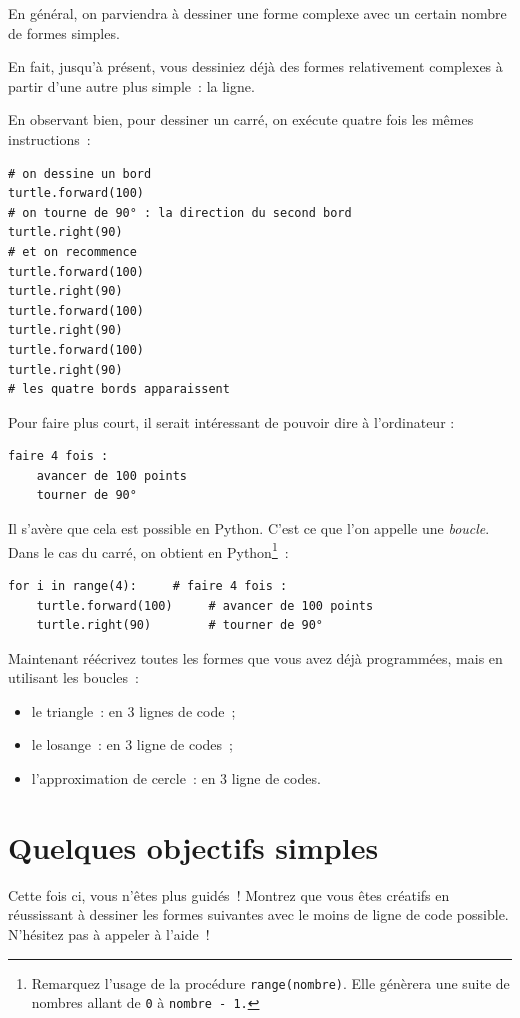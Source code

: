 \documentclass[11pt,a4paper]{article}
\begin{document}
En général, on parviendra à dessiner une forme complexe avec un certain nombre
de formes simples.

En fait, jusqu'à présent, vous dessiniez déjà des formes relativement complexes
à partir d'une autre plus simple~: la ligne.

En observant bien, pour dessiner un carré, on exécute quatre fois les mêmes
instructions~:

\begin{lstlisting}
# on dessine un bord
turtle.forward(100)
# on tourne de 90° : la direction du second bord
turtle.right(90)
# et on recommence
turtle.forward(100)
turtle.right(90)
turtle.forward(100)
turtle.right(90)
turtle.forward(100)
turtle.right(90)
# les quatre bords apparaissent
\end{lstlisting}

Pour faire plus court, il serait intéressant de pouvoir dire à
l'ordinateur :

\begin{lstlisting}
faire 4 fois :
    avancer de 100 points
    tourner de 90°
\end{lstlisting}

Il s'avère que cela est possible en Python. C'est ce que l'on appelle une
\emph{boucle}. Dans le cas du carré, on obtient en Python\footnote{Remarquez
l'usage de la procédure \lstinline{range(nombre)}. Elle génèrera une suite de
nombres allant de \lstinline{0} à \lstinline{nombre - 1.}}~:

\begin{lstlisting}
for i in range(4):     # faire 4 fois :
    turtle.forward(100)     # avancer de 100 points
    turtle.right(90)        # tourner de 90°
\end{lstlisting}

Maintenant réécrivez toutes les formes que vous avez déjà programmées, mais en
utilisant les boucles~:

\begin{itemize}
\item le triangle~: en 3 lignes de code~;
\item le losange~: en 3 ligne de codes~;
\item l'approximation de cercle~: en 3 ligne de codes.
\end{itemize}

\section{Quelques objectifs simples}
Cette fois ci, vous n'êtes plus guidés~! Montrez que vous êtes créatifs en
réussissant à dessiner les formes suivantes avec le moins de ligne de code
possible. N'hésitez pas à appeler à l'aide~!
\end{document}
